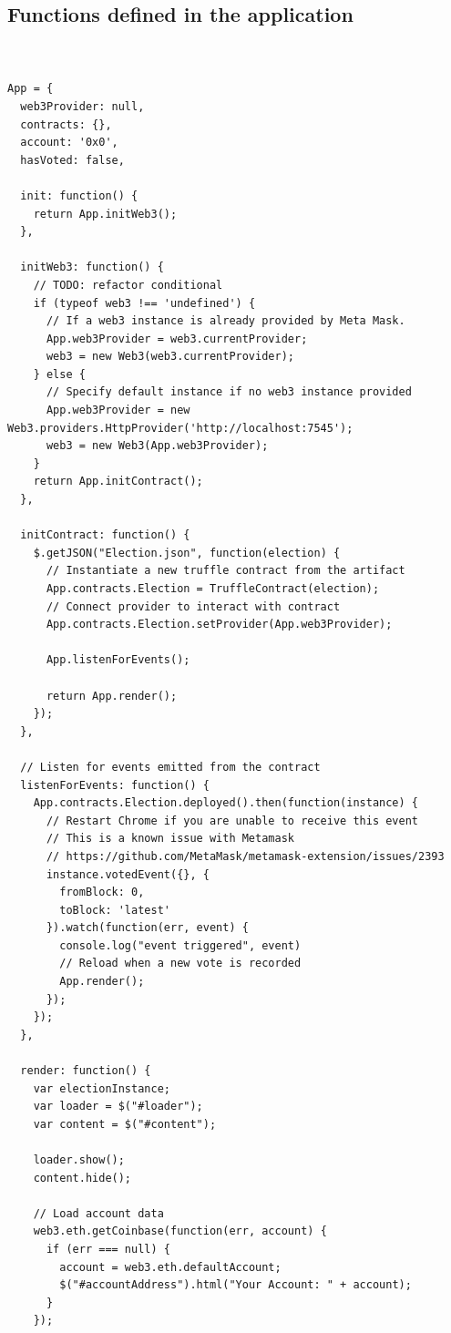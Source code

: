 \documentclass{report}
\begin{document}
\begin{enumerate}
\chapter{Functions defined in the application}

\begin{verbatim}
    

App = {
  web3Provider: null,
  contracts: {},
  account: '0x0',
  hasVoted: false,

  init: function() {
    return App.initWeb3();
  },

  initWeb3: function() {
    // TODO: refactor conditional
    if (typeof web3 !== 'undefined') {
      // If a web3 instance is already provided by Meta Mask.
      App.web3Provider = web3.currentProvider;
      web3 = new Web3(web3.currentProvider);
    } else {
      // Specify default instance if no web3 instance provided
      App.web3Provider = new Web3.providers.HttpProvider('http://localhost:7545');
      web3 = new Web3(App.web3Provider);
    }
    return App.initContract();
  },

  initContract: function() {
    $.getJSON("Election.json", function(election) {
      // Instantiate a new truffle contract from the artifact
      App.contracts.Election = TruffleContract(election);
      // Connect provider to interact with contract
      App.contracts.Election.setProvider(App.web3Provider);

      App.listenForEvents();

      return App.render();
    });
  },

  // Listen for events emitted from the contract
  listenForEvents: function() {
    App.contracts.Election.deployed().then(function(instance) {
      // Restart Chrome if you are unable to receive this event
      // This is a known issue with Metamask
      // https://github.com/MetaMask/metamask-extension/issues/2393
      instance.votedEvent({}, {
        fromBlock: 0,
        toBlock: 'latest'
      }).watch(function(err, event) {
        console.log("event triggered", event)
        // Reload when a new vote is recorded
        App.render();
      });
    });
  },

  render: function() {
    var electionInstance;
    var loader = $("#loader");
    var content = $("#content");

    loader.show();
    content.hide();

    // Load account data
    web3.eth.getCoinbase(function(err, account) {
      if (err === null) {
        account = web3.eth.defaultAccount;
        $("#accountAddress").html("Your Account: " + account);
      }
    });


\end{verbatim}
\end{enumerate}
\end{document}
